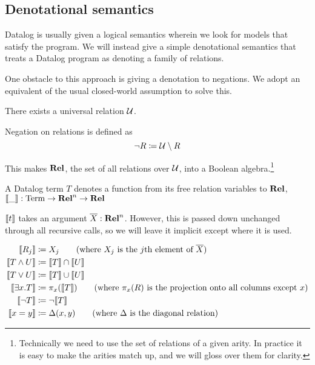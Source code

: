 \subsection{Denotational semantics}

Datalog is usually given a logical semantics wherein we look for models that
satisfy the program. We will instead give a simple denotational semantics that treats a Datalog
program as denoting a family of relations.

One obstacle to this approach is giving a denotation to negations. We adopt an
equivalent of the usual closed-world assumption to solve this.

\begin{defn}
  There exists a universal relation $\mathcal{U}$.

  Negation on relations is defined as
  \begin{displaymath}
    \neg R \coloneqq \mathcal{U} \setminus R
  \end{displaymath}
\end{defn}

This makes $\mathbf{Rel}$, the set of all relations over $\mathcal{U}$, into a Boolean
algebra.\footnote{Technically we need to use the set of relations of a given
  arity. In practice it is easy to make the arities match up, and we will gloss
  over them for clarity.}

\begin{defn}
  A Datalog term $T$ denotes a function from its free relation variables to
  $\mathbf{Rel}$, $\llbracket \_ \rrbracket : \mathrm{Term} \rightarrow \mathbf{Rel}^n \rightarrow \mathbf{Rel}$

  $\llbracket t \rrbracket$ takes an argument $\overline{X} : \mathbf{Rel}^n$. However, this is
  passed down unchanged through all recursive calls, so we will leave it
  implicit except where it is used.

  \begin{align*}
    \denote{R_j} &\defeq X_j \tag{where $X_j$ is the $j$th element of $\overline{X}$}\\
    \denote{T \wedge U} &\defeq \denote{T} \cap \denote{U}\\
    \denote{T \vee U} &\defeq \denote{T} \cup \denote{U}\\
    \denote{\exists x. T} &\defeq \pi_x(\denote{T}) \tag{where $\pi_x(R)$ is the projection onto all columns except $x$}\\
    \denote{\neg T} &\defeq \neg \denote{T}\\
    \denote{x=y} &\defeq \Delta(x, y) \tag{where $\Delta$ is the diagonal relation}
  \end{align*}
\end{defn}

